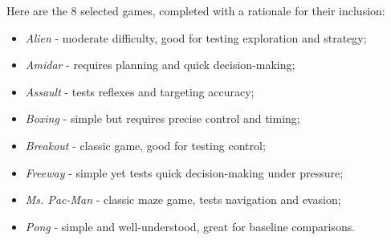 Here are the 8 selected games, completed with a rationale for their inclusion:
\begin{itemize}
	\item \textit{Alien} - moderate difficulty, good for testing exploration and strategy;
	\item \textit{Amidar} - requires planning and quick decision-making;
	\item \textit{Assault} - tests reflexes and targeting accuracy;
	\item \textit{Boxing} - simple but requires precise control and timing;
	\item \textit{Breakout} - classic game, good for testing control;
	\item \textit{Freeway} - simple yet tests quick decision-making under pressure;
	\item \textit{Ms. Pac-Man} - classic maze game, tests navigation and evasion;
	\item \textit{Pong} - simple and well-understood, great for baseline comparisons.
\end{itemize}

